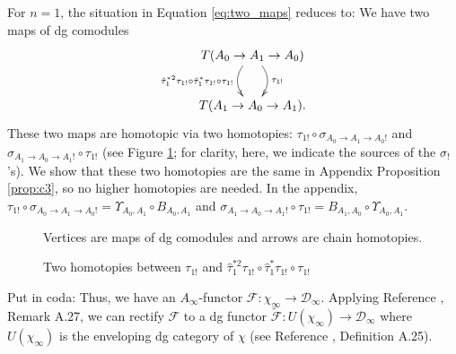 For $n=1$, the situation in Equation 
\ref{eq:two_maps} reduces to: 
We have two maps of dg comodules
$$
\xymatrix{
T(A_0 \to A_1 \to A_0) 
 \ar@/^1pc/[d]^{\tau_{1!}}
 \ar@/_1pc/[d]_{\hat{\tau}_1^{*2} \tau_{1!}\circ
   \hat{\tau}_1^*\tau_{1!}\circ \tau_{1!}}\\
T(A_1 \to A_0 \to A_1).
}
$$
These two maps are homotopic via 
two homotopies: 
$\tau_{1!} \circ \sigma_{A_0 \to A_1 \to A_0!}$ 
and 
$\sigma_{A_1 \to A_0 \to A_1!} \circ \tau_{1!}$ 
(see Figure \ref{fig:two_homotopies_1}; 
for clarity, here, we indicate the sources 
of the $\sigma_!$'s). We show that these two 
homotopies are the same in Appendix Proposition 
\ref{prop:c3}, so no higher homotopies are 
needed. In the appendix, $\tau_{1!} \circ 
\sigma_{A_0 \to A_1 \to A_0!} = \Upsilon_{A_0,A_1} 
\circ B_{A_0,A_1}$ and 
$\sigma_{A_1 \to A_0 \to A_1!} \circ 
\tau_{1!} = B_{A_1,A_0} \circ \Upsilon_{A_0,A_1}$.
%
\begin{figure}%
\xymatrixrowsep{4pc}
\centerline{}
\caption{Two homotopies between 
$\tau_{1!}$ and $\hat{\tau}_1^{*2} \tau_{1!}\circ
\hat{\tau}_1^*\tau_{1!}\circ \tau_{1!}$}
\label{fig:two_homotopies_1}
Vertices are maps of dg comodules and 
arrows are chain homotopies.
\end{figure}
%
Put in coda:
Thus, we have an $A_\infty$-functor 
$\mathcal{F}:\chi_\infty \to
\mathcal{D}_\infty$. Applying Reference 
\cite{F}, Remark A.27, we can rectify 
$\mathcal{F}$ to a dg functor 
$\tilde{\mathcal{F}}: U(\chi_\infty) \to 
\mathcal{D}_\infty$ where $U(\chi_\infty)$ 
is the enveloping dg category of $\chi$ 
(see Reference \cite{F}, Definition A.25).